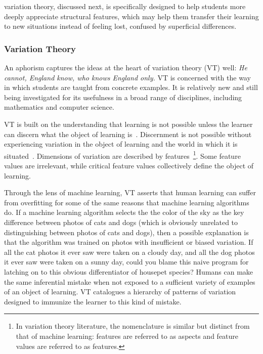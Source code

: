 variation theory, discussed next, is specifically designed to help students more deeply appreciate structural features, which may help them transfer their learning to new situations instead of feeling lost, confused by superficial differences.

\subsubsection{Variation Theory}

An aphorism captures the ideas at the heart of variation theory (VT) well: {\it He cannot, England know, who knows England only.} VT is concerned with the way in which students are taught from concrete examples. It is relatively new and still being investigated for its usefulness in a broad range of disciplines, including mathematics and computer science.%

VT is built on the understanding that learning is not possible unless the learner can discern what the object of learning is~\cite{marton1997learning}. Discernment is not possible without experiencing variation in the object of learning and the world in which it is situated~\cite{marton2004classroom}. Dimensions of variation are described by features~\cite{ling2012variation}\footnote{In variation theory literature, the nomenclature is similar but distinct from that of machine learning: features are referred to as aspects and feature values are referred to as features.}. Some feature values are irrelevant, while critical feature values collectively define the object of learning.

Through the lens of machine learning, VT asserts that human learning can suffer from overfitting for some of the same reasons that machine learning algorithms do. If a machine learning algorithm selects the the color of the sky as the key difference between photos of cats and dogs (which is obviously unrelated to distinguishing between photos of cats and dogs), then a possible explanation is that the algorithm was trained on photos with insufficient or biased variation. If all the cat photos it ever saw were taken on a cloudy day, and all the dog photos it ever saw were taken on a sunny day, could you blame this naive program for latching on to this obvious differentiator of housepet species? Humans can make the same inferential mistake when not exposed to a sufficient variety of examples of an object of learning. VT catalogues a hierarchy of patterns of variation designed to immunize the learner to this kind of mistake.

